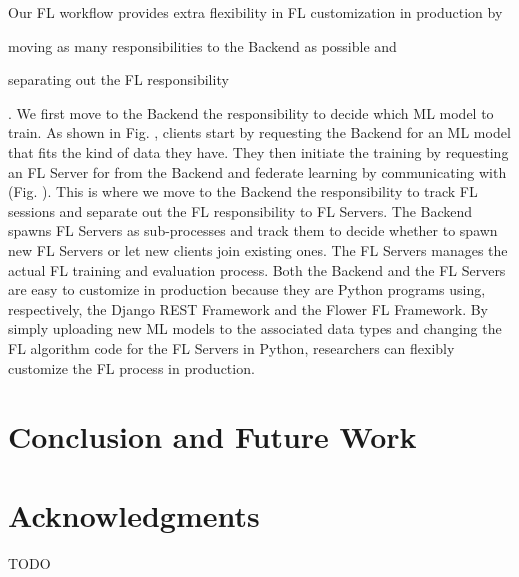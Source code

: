 \documentclass[letterpaper]{article} %
\begin{document}
Our FL workflow provides extra flexibility in FL customization in production by
\begin{enumerate*}[label=\arabic*)]
    \item moving as many responsibilities to the Backend as possible and
    \item separating out the FL responsibility
\end{enumerate*}.
We first move to the Backend the responsibility to
decide which ML model to train.
As shown in Fig. , %
clients start by requesting the Backend for an ML model \model{} that fits
the kind of data they have.
They then initiate the training by requesting an FL Server \fs{} for \model{}
from the Backend and federate learning by communicating with \fs{}
(Fig. ). %
This is where we move to the Backend the responsibility to track FL sessions
and separate out the FL responsibility to FL Servers.
The Backend spawns FL Servers as sub-processes and track them to decide whether
to spawn new FL Servers or let new clients join existing ones.
The FL Servers manages the actual FL training and evaluation process.
Both the Backend and the FL Servers are easy to customize in production because
they are Python programs using, respectively,
the Django REST Framework and the Flower FL Framework.
By simply uploading new ML models to the associated data types and
changing the FL algorithm code for the FL Servers in Python,
researchers can flexibly customize the FL process in production.


\section{Conclusion and Future Work}


\appendix

\section*{Acknowledgments}
TODO

\bigskip


\end{document}
